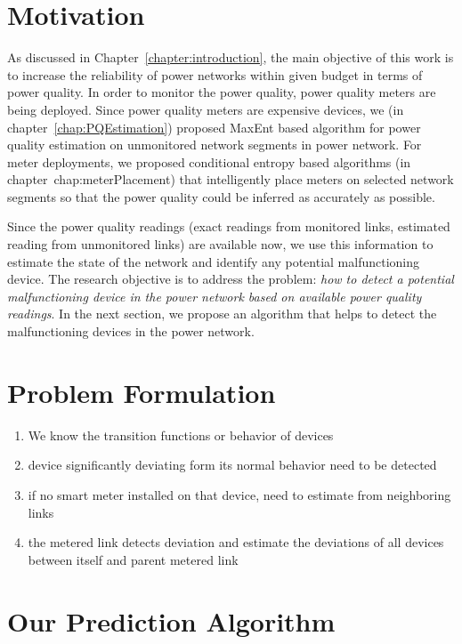 \label{chap:predictionModel}
\section{Motivation}
As discussed in Chapter~\ref{chapter:introduction}, the main objective of this work is to increase the reliability of power networks within given budget in terms of power quality. In order to monitor the power quality, power quality meters are being deployed. Since power quality meters are expensive devices, we (in chapter~\ref{chap:PQEstimation}) proposed MaxEnt based algorithm for power quality estimation on unmonitored network segments in power network. For meter deployments, we proposed conditional entropy based algorithms (in chapter~{chap:meterPlacement}) that intelligently place meters on selected network segments so that the power quality could be inferred as accurately as possible.

Since the power quality readings (exact readings from monitored links, estimated reading from unmonitored links) are available now, we use this information to estimate the state of the network and identify any potential malfunctioning device. The research objective is to address the problem: \textit{how to detect a potential malfunctioning device in the power network based on available power quality readings}. In the next section, we propose an algorithm that helps to detect the malfunctioning devices in the power network.

\section{Problem Formulation}
\begin{enumerate}
\item We know the transition functions or behavior of devices
\item device significantly deviating form its normal behavior need to be detected
\item if no smart meter installed on that device, need to estimate from neighboring links
\item the metered link detects deviation and estimate the deviations of all devices between itself and parent metered link
\end{enumerate}

\section{Our Prediction Algorithm}


